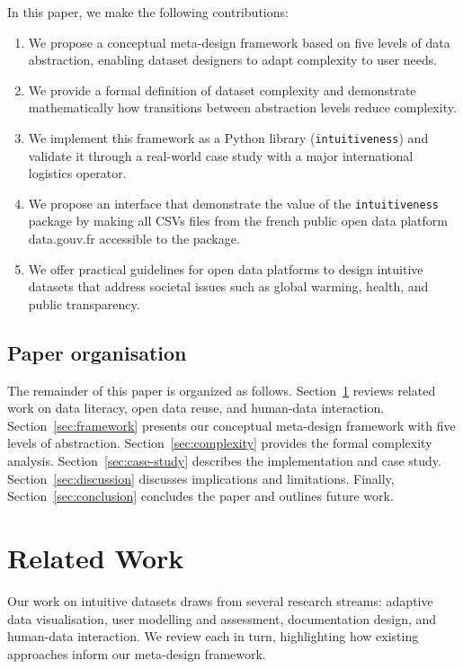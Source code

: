 \documentclass[12pt,a4paper]{article}
\begin{document}
In this paper, we make the following contributions:
\begin{enumerate}
    \item We propose a conceptual meta-design framework based on five levels of data abstraction, enabling dataset designers to adapt complexity to user needs.
    \item We provide a formal definition of dataset complexity and demonstrate mathematically how transitions between abstraction levels reduce complexity.
    \item We implement this framework as a Python library (\texttt{intuitiveness}) and validate it through a real-world case study with a major international logistics operator.
    \item We propose an interface that demonstrate the value of the \texttt{intuitiveness} package by making all CSVs files from the french public open data platform data.gouv.fr accessible to the package. 
    \item We offer practical guidelines for open data platforms to design intuitive datasets that address societal issues such as global warming, health, and public transparency.
\end{enumerate}

\subsection{Paper organisation}

The remainder of this paper is organized as follows. Section~\ref{sec:related-work} reviews related work on data literacy, open data reuse, and human-data interaction. Section~\ref{sec:framework} presents our conceptual meta-design framework with five levels of abstraction. Section~\ref{sec:complexity} provides the formal complexity analysis. Section~\ref{sec:case-study} describes the implementation and case study. Section~\ref{sec:discussion} discusses implications and limitations. Finally, Section~\ref{sec:conclusion} concludes the paper and outlines future work.

\section{Related Work}
\label{sec:related-work}

Our work on intuitive datasets draws from several research streams: adaptive data visualisation, user modelling and assessment, documentation design, and human-data interaction. We review each in turn, highlighting how existing approaches inform our meta-design framework.
\end{document}
